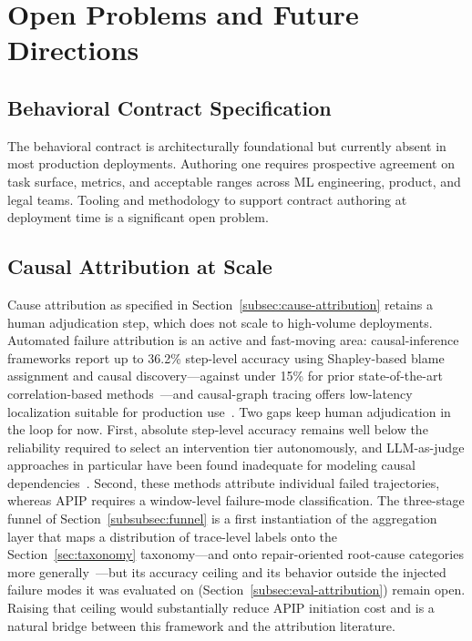 \documentclass[conference]{IEEEtran}
\begin{document}
\section{Open Problems and Future Directions}
\label{sec:open-problems}

\subsection{Behavioral Contract Specification}
\label{subsec:contract-spec}

The behavioral contract is architecturally foundational but currently absent in
most production deployments. Authoring one requires prospective agreement on
task surface, metrics, and acceptable ranges across ML engineering, product,
and legal teams. Tooling and methodology to support contract authoring at
deployment time is a significant open problem.

\subsection{Causal Attribution at Scale}
\label{subsec:attribution-scale}

Cause attribution as specified in Section~\ref{subsec:cause-attribution} retains
a human adjudication step, which does not scale to high-volume deployments.
Automated failure attribution is an active and fast-moving area: causal-inference
frameworks report up to 36.2\% step-level accuracy using Shapley-based blame
assignment and causal discovery---against under 15\% for prior state-of-the-art
correlation-based methods~\cite{ma2025attribution,zhang2025whichagent}---and
causal-graph tracing offers low-latency localization suitable for production
use~\cite{agenttrace2026}. Two gaps keep human adjudication in the loop for now.
First, absolute step-level accuracy remains well below the reliability required
to select an intervention tier autonomously, and LLM-as-judge approaches in
particular have been found inadequate for modeling causal
dependencies~\cite{ma2025attribution}. Second, these methods attribute individual
failed trajectories, whereas APIP requires a window-level failure-mode
classification. The three-stage funnel of Section~\ref{subsubsec:funnel} is a
first instantiation of the aggregation layer that maps a distribution of
trace-level labels onto the Section~\ref{sec:taxonomy} taxonomy---and onto
repair-oriented root-cause categories more
generally~\cite{ma2025lifecycle}---but its accuracy ceiling and its behavior
outside the injected failure modes it was evaluated on
(Section~\ref{subsec:eval-attribution}) remain open. Raising that ceiling
would substantially reduce APIP initiation cost and is a natural bridge
between this framework and the attribution literature.
\end{document}
